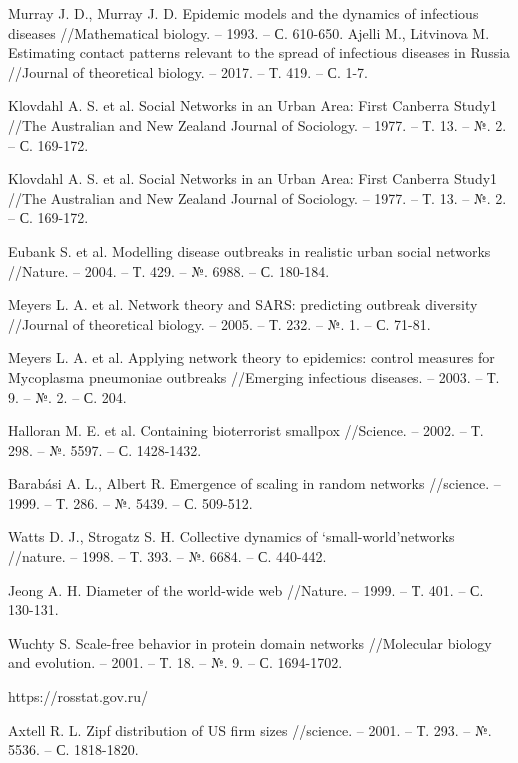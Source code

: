 \documentclass[14pt,a4paper]{article}
\begin{document}
\begin{thebibliography}{99}
	 Murray J. D., Murray J. D. Epidemic models and the dynamics of infectious diseases //Mathematical biology. – 1993. – С. 610-650.
	 Ajelli M., Litvinova M. Estimating contact patterns relevant to the spread of infectious diseases in Russia //Journal of theoretical biology. – 2017. – Т. 419. – С. 1-7.
	
	 Klovdahl A. S. et al. Social Networks in an Urban Area: First Canberra Study1 //The Australian and New Zealand Journal of Sociology. – 1977. – Т. 13. – №. 2. – С. 169-172.
	
	 Klovdahl A. S. et al. Social Networks in an Urban Area: First Canberra Study1 //The Australian and New Zealand Journal of Sociology. – 1977. – Т. 13. – №. 2. – С. 169-172.
	
	 Eubank S. et al. Modelling disease outbreaks in realistic urban social networks //Nature. – 2004. – Т. 429. – №. 6988. – С. 180-184.
	
	 Meyers L. A. et al. Network theory and SARS: predicting outbreak diversity //Journal of theoretical biology. – 2005. – Т. 232. – №. 1. – С. 71-81.
	
	 Meyers L. A. et al. Applying network theory to epidemics: control measures for Mycoplasma pneumoniae outbreaks //Emerging infectious diseases. – 2003. – Т. 9. – №. 2. – С. 204.
	
	 Halloran M. E. et al. Containing bioterrorist smallpox //Science. – 2002. – Т. 298. – №. 5597. – С. 1428-1432.
	
	 Barabási A. L., Albert R. Emergence of scaling in random networks //science. – 1999. – Т. 286. – №. 5439. – С. 509-512.
	
		Watts D. J., Strogatz S. H. Collective dynamics of ‘small-world’networks //nature. – 1998. – Т. 393. – №. 6684. – С. 440-442.
	
	 Jeong A. H. Diameter of the world-wide web //Nature. – 1999. – Т. 401. – С. 130-131.
	
	Wuchty S. Scale-free behavior in protein domain networks //Molecular biology and evolution. – 2001. – Т. 18. – №. 9. – С. 1694-1702.
	
	 https://rosstat.gov.ru/
	
	 Axtell R. L. Zipf distribution of US firm sizes //science. – 2001. – Т. 293. – №. 5536. – С. 1818-1820.
	

\end{thebibliography}
\end{document}
